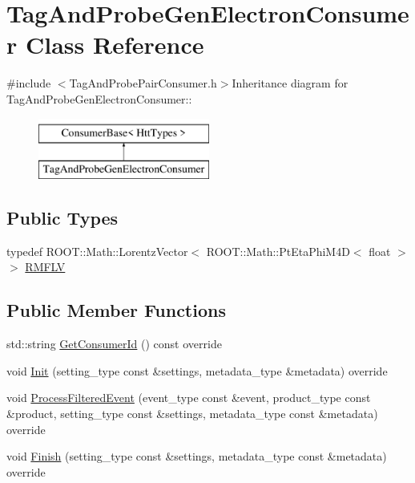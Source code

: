 \hypertarget{classTagAndProbeGenElectronConsumer}{
\section{TagAndProbeGenElectronConsumer Class Reference}
\label{classTagAndProbeGenElectronConsumer}
}


{\ttfamily \#include $<$TagAndProbePairConsumer.h$>$}Inheritance diagram for TagAndProbeGenElectronConsumer::\begin{figure}[H]
\begin{center}
\leavevmode
\includegraphics[height=2cm]{classTagAndProbeGenElectronConsumer}
\end{center}
\end{figure}
\subsection*{Public Types}
\begin{DoxyCompactItemize}
\item 
typedef ROOT::Math::LorentzVector$<$ ROOT::Math::PtEtaPhiM4D$<$ float $>$ $>$ \hyperlink{classTagAndProbeGenElectronConsumer_a31a7636bd49180cf32b5e99eceb05609}{RMFLV}
\end{DoxyCompactItemize}
\subsection*{Public Member Functions}
\begin{DoxyCompactItemize}
\item 
std::string \hyperlink{classTagAndProbeGenElectronConsumer_aae06db426822e38f8c7cf3486197fe8a}{GetConsumerId} () const override
\item 
void \hyperlink{classTagAndProbeGenElectronConsumer_abd8376fc9db6ea7c2fd16e7f476f48c2}{Init} (setting\_\-type const \&settings, metadata\_\-type \&metadata) override
\item 
void \hyperlink{classTagAndProbeGenElectronConsumer_a90114e5dd42f7674d18d94aa0cdf37c5}{ProcessFilteredEvent} (event\_\-type const \&event, product\_\-type const \&product, setting\_\-type const \&settings, metadata\_\-type const \&metadata) override
\item 
void \hyperlink{classTagAndProbeGenElectronConsumer_a509528ca82b59b3f304ed4c825ad7c0f}{Finish} (setting\_\-type const \&settings, metadata\_\-type const \&metadata) override
\end{DoxyCompactItemize}


